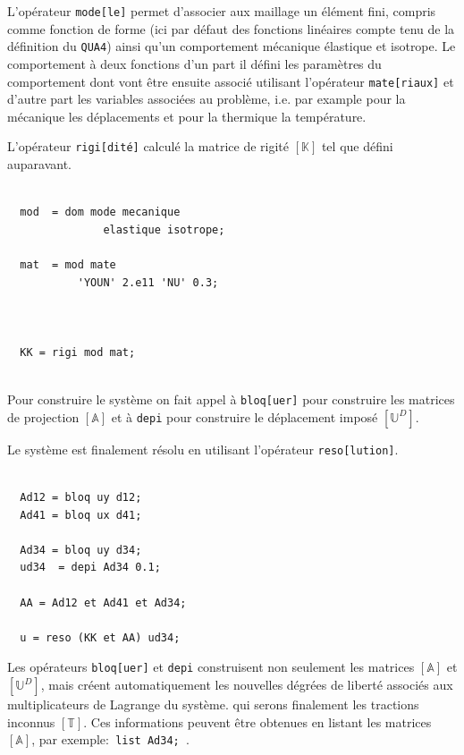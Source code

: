 \begin{castemcom}
L'opérateur \texttt{mode[le]} permet 
d'associer aux maillage un élément fini, compris 
comme fonction de forme (ici par défaut des fonctions linéaires 
compte tenu de la définition du \texttt{QUA4}) ainsi qu'un comportement 
mécanique élastique et isotrope. Le comportement à deux fonctions
d'un part il défini les paramètres du comportement dont vont être 
ensuite associé utilisant l'opérateur \texttt{mate[riaux]} et 
d'autre part les variables associées au problème, i.e. par example 
pour la mécanique les déplacements et pour la thermique la température.   

L'opérateur \texttt{rigi[dité]} calculé la matrice de rigité $[\mathbb{K}]$
tel que défini auparavant.  
\end{castemcom}
\begin{castemlines}
\begin{verbatim}

  mod  = dom mode mecanique 
               elastique isotrope;
	       
  mat  = mod mate 
           'YOUN' 2.e11 'NU' 0.3; 
  
  
  
  KK = rigi mod mat; 
 
\end{verbatim}
\end{castemlines}

\begin{castemcom}
Pour construire le système on fait appel à \texttt{bloq[uer]} 
pour construire les matrices de projection $[\mathbb{A}]$ 
et à \texttt{depi} pour construire le déplacement 
imposé $[\mathbb{U}^D]$. 

Le système est finalement résolu en utilisant l'opérateur 
\texttt{reso[lution]}. 

\end{castemcom}
\begin{castemlines}
\begin{verbatim}
  
  Ad12 = bloq uy d12;
  Ad41 = bloq ux d41;
  
  Ad34 = bloq uy d34;
  ud34  = depi Ad34 0.1;
  
  AA = Ad12 et Ad41 et Ad34;
  
  u = reso (KK et AA) ud34;  

\end{verbatim}
\end{castemlines}

Les opérateurs \texttt{bloq[uer]} et \texttt{depi} construisent 
non seulement les matrices $[\mathbb{A}]$ et $[\mathbb{U}^D]$,
mais créent automatiquement les nouvelles dégrées de 
liberté associés aux multiplicateurs de Lagrange du système. 
qui serons finalement les tractions inconnus $[\mathbb{T}]$. 
Ces informations peuvent être obtenues en listant les matrices $[\mathbb{A}]$, 
par exemple:\texttt{ list Ad34; }. 
       
